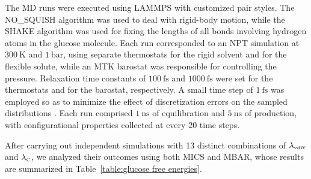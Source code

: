 \documentclass[journal=jctcce,manuscript=article,layout=twocolumn]{achemso}
\begin{document}
The MD runs were executed using LAMMPS \cite{Plimpton_1995} with customized pair styles. The NO\_SQUISH algorithm \cite{Dullweber_1997, Miller_2002, Silveira_2017} was used to deal with rigid-body motion, while the SHAKE algorithm \cite{Ryckaert_1977} was used for fixing the lengths of all bonds involving hydrogen atoms in the glucose molecule. Each run corresponded to an NPT simulation at $300~\text{K}$ and $1~\text{bar}$, using separate thermostats for the rigid solvent\cite{Kamberaj_2005} and for the flexible solute\cite{Martyna_1994}, while an MTK barostat\cite{Martyna_1994} was responsible for controlling the pressure. Relaxation time constants of $100~\text{fs}$ and $1000~\text{fs}$ were set for the thermostats and for the barostat, respectively. A small time step of $1~\text{fs}$ was employed so as to minimize the effect of discretization errors on the sampled distributions \cite{Davidchack_2012, Silveira_2017}. Each run comprised $1~\text{ns}$ of equilibration and $5~\text{ns}$ of production, with configurational properties collected at every 20 time steps.

After carrying out independent simulations with 13 distinct combinations of $\lambda_\text{\tiny vdW}$ and $\lambda_\text{\tiny C}$, we analyzed their outcomes using both MICS and MBAR, whose results are summarized in Table~\ref{table:glucose free energies}. %


\end{document}
